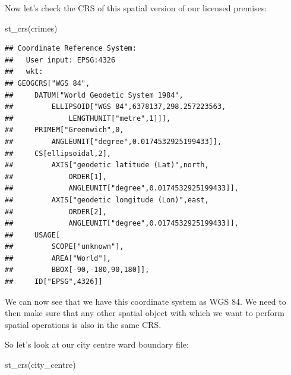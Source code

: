\documentclass[
]{book}
\newenvironment{Shaded}{\begin{snugshade}}{\end{snugshade}}
\newcommand{\FunctionTok}[1]{\textcolor[rgb]{0.00,0.00,0.00}{#1}}
\newcommand{\NormalTok}[1]{#1}
\begin{document}
Now let's check the CRS of this spatial version of our licensed premises:

\begin{Shaded}
\begin{Highlighting}[]
\FunctionTok{st\_crs}\NormalTok{(crimes)}
\end{Highlighting}
\end{Shaded}

\begin{verbatim}
## Coordinate Reference System:
##   User input: EPSG:4326 
##   wkt:
## GEOGCRS["WGS 84",
##     DATUM["World Geodetic System 1984",
##         ELLIPSOID["WGS 84",6378137,298.257223563,
##             LENGTHUNIT["metre",1]]],
##     PRIMEM["Greenwich",0,
##         ANGLEUNIT["degree",0.0174532925199433]],
##     CS[ellipsoidal,2],
##         AXIS["geodetic latitude (Lat)",north,
##             ORDER[1],
##             ANGLEUNIT["degree",0.0174532925199433]],
##         AXIS["geodetic longitude (Lon)",east,
##             ORDER[2],
##             ANGLEUNIT["degree",0.0174532925199433]],
##     USAGE[
##         SCOPE["unknown"],
##         AREA["World"],
##         BBOX[-90,-180,90,180]],
##     ID["EPSG",4326]]
\end{verbatim}

We can now see that we have this coordinate system as WGS 84. We need to then make sure that any other spatial object with which we want to perform spatial operations is also in the same CRS.

So let's look at our city centre ward boundary file:

\begin{Shaded}
\begin{Highlighting}[]
\FunctionTok{st\_crs}\NormalTok{(city\_centre)}
\end{Highlighting}
\end{Shaded}
\end{document}
